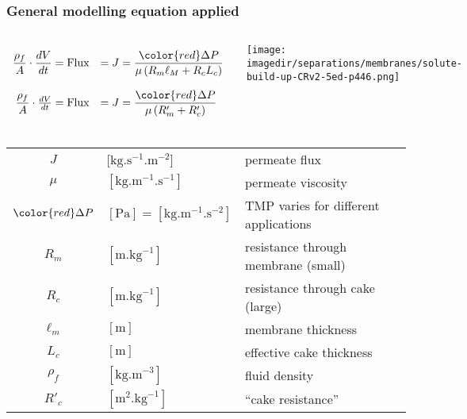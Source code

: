 \begin{frame}\frametitle{General modelling equation applied}
	\vspace{-12pt}
	\begin{columns}[c]
			\[
				\begin{array}{rl}
					\dfrac{\rho_f}{A}\cdot\dfrac{dV}{dt} = \text{Flux} &= J = \dfrac{{\color{red}\Delta P}}{\mu \left(R_m \ell_M + R_c L_c \right)} \\
					\\
					\dfrac{\rho_f}{A}\cdot\frac{dV}{dt} = \text{Flux} &= J = \dfrac{{\color{red}\Delta P}}{\mu \left(R'_m + R'_c \right)}
				\end{array}
			\]
			\vspace{-12pt}
			\begin{center}
				\texttt{[image: \\imagedir/separations/membranes/solute-build-up-CRv2-5ed-p446.png]}
			\end{center}
	\end{columns}
	
	\vspace{-24pt}
	\begin{tabular}{cll}
		$J$			&	[$\text{kg}.\text{s}^{-1}\text{.m}^{-2}$] 				& permeate flux \\
		$\mu$ 		&  	$[\text{kg}.\text{m}^{-1}\text{.s}^{-1}]$				& permeate viscosity\\
		${\color{red}\Delta P}$	&	$[\text{Pa}] = [\text{kg}.\text{m}^{-1}\text{.s}^{-2}]$ & TMP varies for different applications\\
		$R_m$ 		&  	$[\text{m}.\text{kg}^{-1}]$								& resistance through membrane (small)\\
		$R_c$ 		&  	$[\text{m}.\text{kg}^{-1}]$								& resistance through cake (large)\\
		$\ell_m$ 	&   $[\text{m}]$											& membrane thickness\\
		$L_c$ 		&   $[\text{m}]$											& effective cake thickness\\
		$\rho_f$ 	& 	$[\text{kg.m}^{-3}]$ 									& fluid density\\
		$R'_c$ 		&  	$[\text{m}^2.\text{kg}^{-1}]$							& ``cake resistance''
	\end{tabular}
	\vspace{12pt}
\end{frame}

